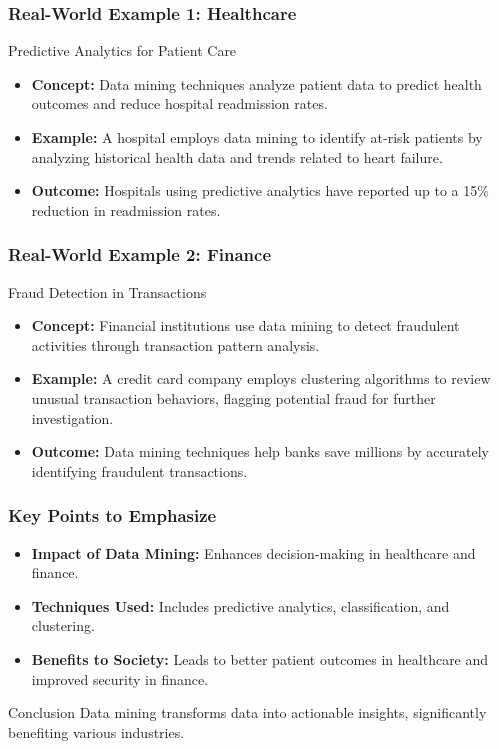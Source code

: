 \documentclass[aspectratio=169]{beamer}
\begin{document}
\begin{frame}[fragile]
    \frametitle{Real-World Example 1: Healthcare}
    \begin{block}{Predictive Analytics for Patient Care}
        \begin{itemize}
            \item \textbf{Concept:} Data mining techniques analyze patient data to predict health outcomes and reduce hospital readmission rates.
            \item \textbf{Example:} A hospital employs data mining to identify at-risk patients by analyzing historical health data and trends related to heart failure.
            \item \textbf{Outcome:} Hospitals using predictive analytics have reported up to a 15\% reduction in readmission rates.
        \end{itemize}
    \end{block}
\end{frame}

\begin{frame}[fragile]
    \frametitle{Real-World Example 2: Finance}
    \begin{block}{Fraud Detection in Transactions}
        \begin{itemize}
            \item \textbf{Concept:} Financial institutions use data mining to detect fraudulent activities through transaction pattern analysis.
            \item \textbf{Example:} A credit card company employs clustering algorithms to review unusual transaction behaviors, flagging potential fraud for further investigation.
            \item \textbf{Outcome:} Data mining techniques help banks save millions by accurately identifying fraudulent transactions.
        \end{itemize}
    \end{block}
\end{frame}

\begin{frame}[fragile]
    \frametitle{Key Points to Emphasize}
    \begin{itemize}
        \item \textbf{Impact of Data Mining:} Enhances decision-making in healthcare and finance.
        \item \textbf{Techniques Used:} Includes predictive analytics, classification, and clustering.
        \item \textbf{Benefits to Society:} Leads to better patient outcomes in healthcare and improved security in finance.
    \end{itemize}
    \begin{block}{Conclusion}
        Data mining transforms data into actionable insights, significantly benefiting various industries.
    \end{block}
\end{frame}
\end{document}
